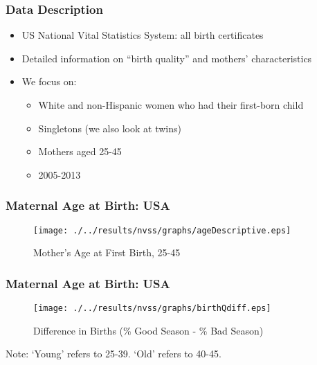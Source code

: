 \documentclass[10pt,letterpaper,subeqn]{beamer}
\begin{document}
\begin{frame}[label=datades]
\frametitle{Data Description}
\begin{itemize}
\item US National Vital Statistics System: all birth certificates
\item Detailed information on ``birth quality'' and mothers' characteristics
\item We focus on:
      \begin{itemize}
        \item White and non-Hispanic women who had their first-born child
        \item Singletons (we also look at twins)
        \item Mothers aged 25-45
        \item 2005-2013
      \end{itemize}
\end{itemize}
\end{frame}



\begin{frame}[label=sum]

\end{frame}

\begin{frame}[label=BQs]

\end{frame}


\begin{frame}[label=births]
\frametitle{Maternal Age at Birth: USA}
\begin{figure}[htpb!]
\begin{center}
  \centering
  \caption{Mother's Age at First Birth, 25-45}
  \texttt{[image: ./../results/nvss/graphs/ageDescriptive.eps]}
  \label{fig:NVSSbirths}
\end{center}
\end{figure}
\vspace{-5mm}
\end{frame}

\begin{frame}[label=births]
\frametitle{Maternal Age at Birth: USA}
\begin{figure}[htpb!]
\begin{center}
  \centering
  \caption{Difference in Births (\% Good Season - \% Bad Season)}
  \texttt{[image: ./../results/nvss/graphs/birthQdiff.eps]}
  \label{fig:NVSSbirths}
\end{center}
\end{figure}
\vspace{-5mm}
\footnotesize{Note: `Young' refers to 25-39.  `Old' refers to 40-45.}
\end{frame}
\end{document}
